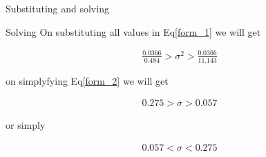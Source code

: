 \documentclass{beamer}
\begin{document}
\begin{frame}{Substituting and solving}
     \begin{block}{Solving}
        On substituting all values in Eq\eqref{form_1} we will get
        
        \begin{align}
            \frac{0.0366}{0.484} > \sigma^{2} > \frac{0.0366}{11.143}
            \label{form_2}
        \end{align}
        
        on simplyfying Eq\eqref{form_2} we will get
        
        \begin{align}
           0.275  > \sigma > 0.057 
        \end{align}
        
        or simply
        
        \begin{align}
            0.057 < \sigma < 0.275
        \end{align}
        
     \end{block}
\end{frame}
\end{document}
